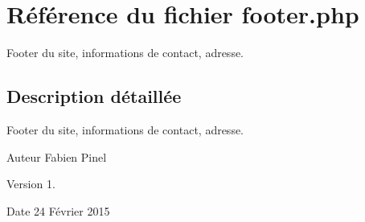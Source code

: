 \hypertarget{footer_8php}{\section{Référence du fichier footer.\-php}
\label{footer_8php}
}


Footer du site, informations de contact, adresse.  




\subsection{Description détaillée}
Footer du site, informations de contact, adresse. \begin{DoxyAuthor}{Auteur}
Fabien Pinel 
\end{DoxyAuthor}
\begin{DoxyVersion}{Version}
1. 
\end{DoxyVersion}
\begin{DoxyDate}{Date}
24 Février 2015 
\end{DoxyDate}
